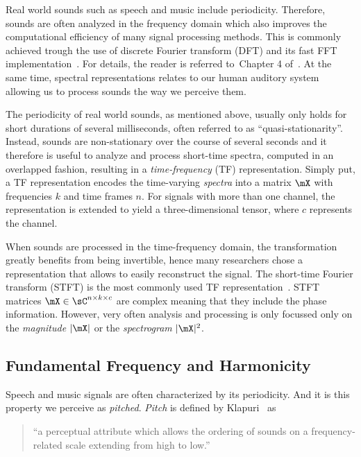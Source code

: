 Real world sounds such as speech and music include periodicity.
Therefore, sounds are often analyzed in the frequency domain which also improves the computational efficiency of many signal processing methods.
This is commonly achieved trough the use of discrete Fourier transform (DFT) and its fast FFT implementation~\cite{cooley65}. 
For details, the reader is referred to~Chapter 4 of~\cite{proakis96}.
At the same time, spectral representations relates to our human auditory system~\cite{zwicker13, moore89, bregman90} allowing us to process sounds the way we perceive them.
\par
The periodicity of real world sounds, as mentioned above, usually only holds for short durations of several milliseconds, often referred to as ``quasi-stationarity''.
Instead, sounds are non-stationary over the course of several seconds and it therefore is useful to analyze and process short-time spectra, computed in an overlapped fashion, resulting in a \emph{time-frequency} (TF) representation.
Simply put, a TF representation encodes the time-varying \textit{spectra} into a matrix \(\mX\) with frequencies \(k\) and time frames \(n\).
For signals with more than one channel, the representation is extended to yield a three-dimensional tensor, where \(c\) represents the channel.
\par
When sounds are processed in the time-frequency domain, the transformation greatly benefits from being invertible, hence many researchers chose a representation that allows to easily reconstruct the signal.
The short-time Fourier transform (STFT) is the most commonly used TF representation~\cite{mcaulay86}.
STFT matrices \(\mX \in \sC^{n \times k \times c}\) are complex meaning that they include the phase information.
However, very often analysis and processing is only focussed only on the \emph{magnitude} \(|\mX|\) or the \emph{spectrogram} \(|\mX|^2\).

\subsection{Fundamental Frequency and Harmonicity}

Speech and music signals are often characterized by its periodicity.
And it is this property we perceive as \emph{pitched}.
\emph{Pitch} is defined by Klapuri~\cite{klapuri06book} as 

\begin{quote}
``a perceptual attribute which allows the ordering of sounds on a frequency-related scale extending from high to low.''
\end{quote}

